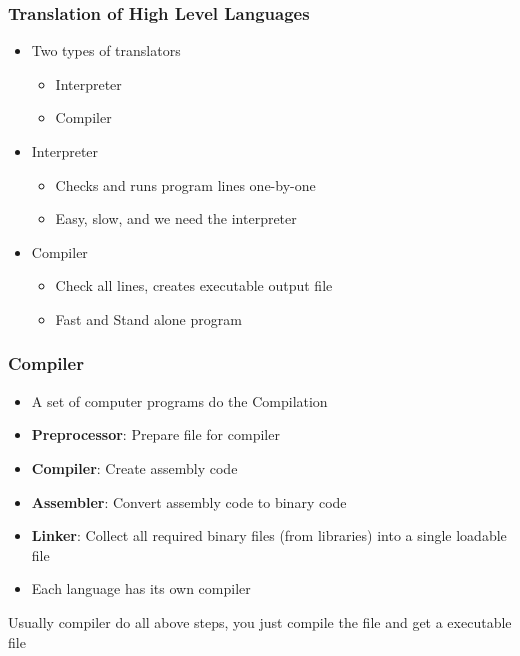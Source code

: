 \documentclass{../c-lecture}
\begin{document}
\begin{frame}
  \frametitle{Translation of High Level Languages}
  \begin{itemize}
    \item Two types of translators
    \begin{itemize}
      \item Interpreter
      \item Compiler
    \end{itemize}
    \item Interpreter
    \begin{itemize}
      \item Checks and runs program lines one-by-one
      \item Easy, slow, and we need the interpreter
    \end{itemize}
    \item Compiler
    \begin{itemize}
      \item Check all lines, creates executable output file
      \item Fast and Stand alone program
    \end{itemize}
  \end{itemize}
\end{frame}

\begin{frame}
  \frametitle{Compiler}
  \begin{itemize}
    \item
      A {\color{Orange} set} of computer programs do the
      {\color{Green} Compilation}
    \item
      \textbf{\color{Orange} Preprocessor}: Prepare file for compiler
    \item \textbf{\color{Orange} Compiler}: Create assembly code
    \item
      \textbf{\color{Green} Assembler}: Convert assembly code to binary
      code
    \item
      \textbf{\color{Green} Linker}: Collect all required binary files
      (from libraries) into a single loadable file
    \item Each language has its own compiler
  \end{itemize}

  \begin{block}{}
  Usually compiler do all above steps, you just compile the file and get a
  executable file
  \end{block}
\end{frame}
\end{document}
